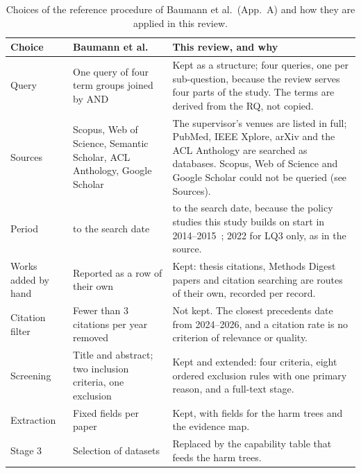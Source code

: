 \begin{table}[tbp]
\centering
\begin{singlespace}
\caption[Choices of the reference procedure and how they are applied]{Choices of
the reference procedure of Baumann et al.\ (App.~A) and how they are applied in
this review.}
\label{tab:lit-adaptation}
\small
\begin{tabularx}{\textwidth}{@{}>{\raggedright\arraybackslash}p{2.3cm}>{\raggedright\arraybackslash}p{3.6cm}>{\raggedright\arraybackslash}X@{}}
\toprule
\textbf{Choice} & \textbf{Baumann et al.} & \textbf{This review, and why} \\
\midrule
Query & One query of four term groups joined by AND & Kept as a structure; four queries, one per sub-question, because the review serves four parts of the study. The terms are derived from the RQ, not copied. \\
\addlinespace
Sources & Scopus, Web of Science, Semantic Scholar, ACL Anthology, Google Scholar & The supervisor's venues are listed in full; PubMed, IEEE Xplore, arXiv and the ACL Anthology are searched as databases. Scopus, Web of Science and Google Scholar could not be queried (see Sources). \\
\addlinespace
Period & 2022 to the search date & 2014 to the search date, because the policy studies this study builds on start in 2014--2015~\parencite{sunyaev2015availability}; 2022 for LQ3 only, as in the source. \\
\addlinespace
Works added by hand & Reported as a row of their own & Kept: thesis citations, Methods Digest papers and citation searching are routes of their own, recorded per record. \\
\addlinespace
Citation filter & Fewer than 3 citations per year removed & Not kept. The closest precedents date from 2024--2026, and a citation rate is no criterion of relevance or quality. \\
\addlinespace
Screening & Title and abstract; two inclusion criteria, one exclusion & Kept and extended: four criteria, eight ordered exclusion rules with one primary reason, and a full-text stage. \\
\addlinespace
Extraction & Fixed fields per paper & Kept, with fields for the harm trees and the evidence map. \\
\addlinespace
Stage 3 & Selection of datasets & Replaced by the capability table that feeds the harm trees. \\
\bottomrule
\end{tabularx}
\end{singlespace}
\end{table}

